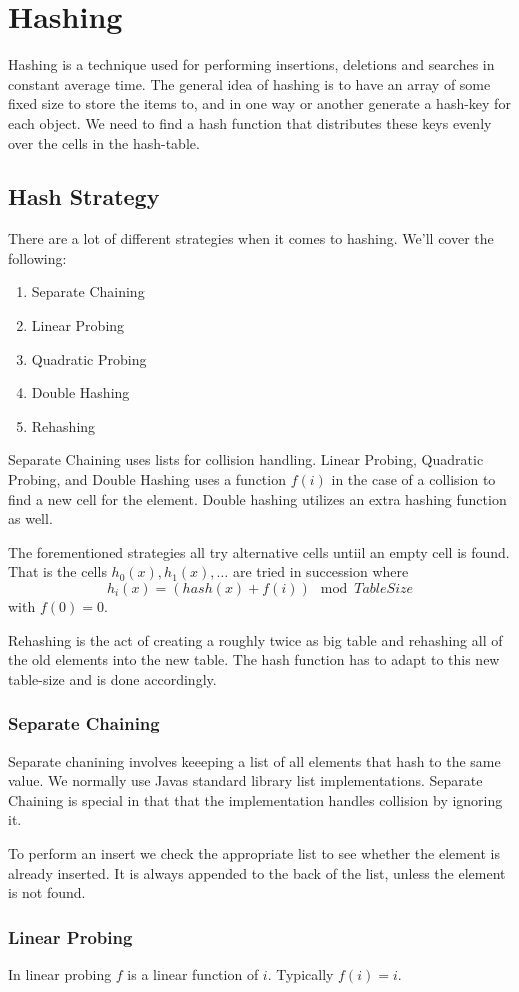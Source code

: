 \documentclass[paper=a4, fontsize=11pt]{scrartcl}
\numberwithin{equation}{section} %
\numberwithin{figure}{section} %
\numberwithin{table}{section} %
\theoremstyle{definition}
\begin{document}
\section{Hashing}
Hashing is a technique used for performing insertions, deletions and searches in constant average time.
The general idea of hashing is to have an array of some fixed size to store the items to, and in one way or another generate
a hash-key for each object. We need to find a hash function that distributes these keys evenly over the cells in the hash-table.

\subsection{Hash Strategy}
There are a lot of different strategies when it comes to hashing. We'll cover the following:

\begin{enumerate}
  \item Separate Chaining
  \item Linear Probing
  \item Quadratic Probing
  \item Double Hashing
  \item Rehashing
\end{enumerate}

Separate Chaining uses lists for collision handling. Linear Probing, Quadratic Probing, and Double Hashing uses a function \(f(i)\)
in the case of a collision to find a new cell for the element. Double hashing utilizes an extra hashing function as well. 


The forementioned strategies all try alternative cells untiil an empty cell is found. That is the cells \(h_0(x), h_1(x), \dots\) are tried
in succession where 
\[ h_i(x) = (hash(x) + f(i)) \mod TableSize\]
with \(f(0)=0\).

Rehashing is the act of creating a roughly twice as big table and rehashing all of the old elements into the new table. The hash function
has to adapt to this new table-size and is done accordingly.

\subsubsection{Separate Chaining}
Separate chanining involves keeeping a list of all elements that hash to the same value.
We normally use Javas standard library list implementations. Separate Chaining is special in that that
the implementation handles collision by ignoring it. 

To perform an insert we check the appropriate list to see whether the element is already inserted.
It is always appended to the back of the list, unless the element is not found.

\subsubsection{Linear Probing}
In linear probing \(f\) is a linear function of \(i\). Typically \(f\left( i \right) = i\).
\end{document}

